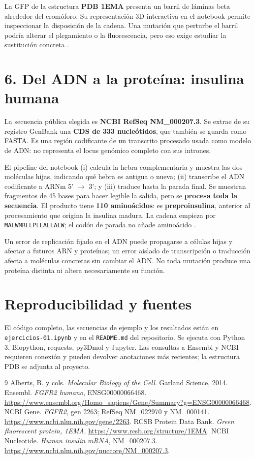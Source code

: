 \documentclass[10pt,a4paper]{article}
\begin{document}
La GFP de la estructura \textbf{PDB 1EMA} presenta un barril de láminas beta alrededor del cromóforo. Su representación 3D interactiva en el notebook permite inspeccionar la disposición de la cadena. Una mutación que perturbe el barril podría alterar el plegamiento o la fluorescencia, pero eso exige estudiar la sustitución concreta \cite{pdb}.

\section*{6. Del ADN a la proteína: insulina humana}
La secuencia pública elegida es \textbf{NCBI RefSeq NM\_000207.3}. Se extrae de su registro GenBank una \textbf{CDS de 333 nucleótidos}, que también se guarda como FASTA. Es una región codificante de un transcrito procesado usada como modelo de ADN: no representa el locus genómico completo con sus intrones.

El pipeline del notebook (i) calcula la hebra complementaria y muestra las dos moléculas hijas, indicando qué hebra es antigua o nueva; (ii) transcribe el ADN codificante a ARNm 5' $\rightarrow$ 3'; y (iii) traduce hasta la parada final. Se muestran fragmentos de 45 bases para hacer legible la salida, pero se \textbf{procesa toda la secuencia}. El producto tiene \textbf{110 aminoácidos}: es \textbf{preproinsulina}, anterior al procesamiento que origina la insulina madura. La cadena empieza por \texttt{MALWMRLLPLLALLALW}; el codón de parada no añade aminoácido \cite{ncbiINS}.

Un error de replicación fijado en el ADN puede propagarse a células hijas y afectar a futuros ARN y proteínas; un error aislado de transcripción o traducción afecta a moléculas concretas sin cambiar el ADN. No toda mutación produce una proteína distinta ni altera necesariamente su función.

\section*{Reproducibilidad y fuentes}
El código completo, las secuencias de ejemplo y los resultados están en \texttt{ejercicios-01.ipynb} y en el \texttt{README.md} del repositorio. Se ejecuta con Python 3, Biopython, requests, py3Dmol y Jupyter. Las consultas a Ensembl y NCBI requieren conexión y pueden devolver anotaciones más recientes; la estructura PDB se adjunta al proyecto.

\begin{thebibliography}{9}\small
{} Alberts, B. y cols. \emph{Molecular Biology of the Cell}. Garland Science, 2014.
 Ensembl. \emph{FGFR2 humano}, ENSG00000066468. \url{https://www.ensembl.org/Homo_sapiens/Gene/Summary?g=ENSG00000066468}.
 NCBI Gene. \emph{FGFR2}, gen 2263; RefSeq NM\_022970 y NM\_000141. \url{https://www.ncbi.nlm.nih.gov/gene/2263}.
 RCSB Protein Data Bank. \emph{Green fluorescent protein, 1EMA}. \url{https://www.rcsb.org/structure/1EMA}.
 NCBI Nucleotide. \emph{Human insulin mRNA}, NM\_000207.3. \url{https://www.ncbi.nlm.nih.gov/nuccore/NM_000207.3}.
\end{thebibliography}
\end{document}
